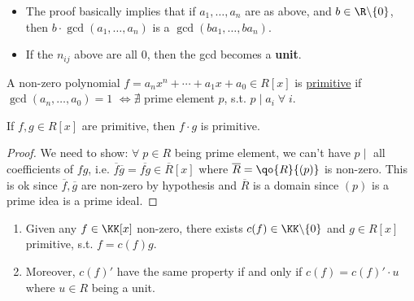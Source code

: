 \begin{remark}
	\leavevmode
	\begin{itemize}
		\item The proof basically implies that if \( a_1,\ldots, a_n \) are as above, and \( b\in \R \backslash
		      \{0\}\), then \( b \cdot \gcd(a_1,\ldots, a_n) \) is a \( \gcd(ba_1,\ldots, ba_n) \).
		\item If the \( n_{ij} \) above are all \( 0 \), then the gcd becomes a \textbf{unit}.
	\end{itemize}
\end{remark}

\begin{definition}
	A non-zero polynomial \( f = a_n x^n + \cdots + a_1 x + a_0 \in R[x] \) is \underline{primitive} if \(
	\gcd(a_n,\ldots, a_0) = 1 \) \( \iff \nexists \) prime element \( p \), s.t. \( p \mid a_i \;
	\forall \; i \).
\end{definition}

\begin{lemma}
	\label{lem:primitive-mult}
	If \( f, g \in R[x] \) are primitive, then \( f \cdot g \) is primitive.
\end{lemma}

\begin{proof}
	We need to show: \( \forall \; p \in R \) being prime element, we can't have \( p \mid \) all
	coefficients of \( fg \), i.e. \( \overline{f} \overline{g} = \overline{fg} \in \overline{R}[x] \)
	where \( \overline{R} = \qo{R}{(p)} \) is non-zero. This is ok since \( \overline{f},\overline{g} \)
	are non-zero by hypothesis and \( \overline{R} \) is a domain since \( (p) \) is a prime idea is a
	prime ideal.
\end{proof}

\begin{lemma}
	\label{lem:primitive-decomp}
	\leavevmode
	\begin{enumerate}
		\item Given any \( f\in \KK[x] \) non-zero, there exists \( c(f) \in \KK\backslash \{0\} \) and
		      \( g\in R[x] \) primitive, s.t. \( f = c(f)g \).
		\item Moreover, \( c(f)'\) have the same property if and only if \( c(f) = c(f)'\cdot u \) where
		      \( u \in R \) being a unit.
	\end{enumerate}
\end{lemma}

